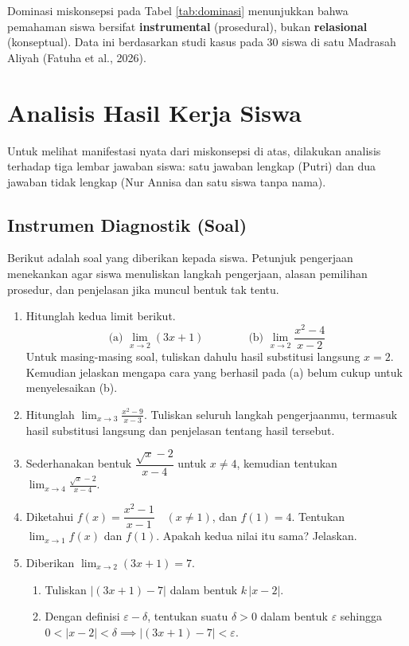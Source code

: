 \documentclass[12pt,a4paper,openany]{book}
\theoremstyle{definition}
\begin{document}
Dominasi miskonsepsi pada Tabel \ref{tab:dominasi} menunjukkan bahwa pemahaman siswa bersifat \textbf{instrumental} (prosedural), bukan \textbf{relasional} (konseptual). Data ini berdasarkan studi kasus pada 30 siswa di satu Madrasah Aliyah (Fatuha et al., 2026).

\chapter{Analisis Hasil Kerja Siswa}

Untuk melihat manifestasi nyata dari miskonsepsi di atas, dilakukan analisis terhadap tiga lembar jawaban siswa: satu jawaban lengkap (Putri) dan dua jawaban tidak lengkap (Nur Annisa dan satu siswa tanpa nama). 

\section{Instrumen Diagnostik (Soal)}
Berikut adalah soal yang diberikan kepada siswa. Petunjuk pengerjaan menekankan agar siswa menuliskan langkah pengerjaan, alasan pemilihan prosedur, dan penjelasan jika muncul bentuk tak tentu.

\begin{enumerate}[label=\textbf{\arabic*.}]
    \item Hitunglah kedua limit berikut.
    \[
    \text{(a) } \lim_{x\to 2}(3x+1)
    \qquad\qquad
    \text{(b) } \lim_{x\to 2}\frac{x^2-4}{x-2}
    \]
    Untuk masing-masing soal, tuliskan dahulu hasil substitusi langsung \(x=2\). Kemudian jelaskan mengapa cara yang berhasil pada (a) belum cukup untuk menyelesaikan (b).

    \item Hitunglah \(\displaystyle \lim_{x\to 3}\frac{x^2-9}{x-3}\). Tuliskan seluruh langkah pengerjaanmu, termasuk hasil substitusi langsung dan penjelasan tentang hasil tersebut.

    \item Sederhanakan bentuk \(\dfrac{\sqrt{x}-2}{x-4}\) untuk \(x\ne 4\), kemudian tentukan \(\displaystyle \lim_{x\to 4}\frac{\sqrt{x}-2}{x-4}\).

    \item Diketahui \(f(x)=\dfrac{x^2-1}{x-1}\quad (x\ne 1)\), dan \(f(1)=4\). Tentukan \(\displaystyle \lim_{x\to 1} f(x)\) dan \(f(1)\). Apakah kedua nilai itu sama? Jelaskan.

    \item Diberikan \(\displaystyle \lim_{x\to 2}(3x+1)=7\).
    \begin{enumerate}[label=(\alph*)]
        \item Tuliskan \(|(3x+1)-7|\) dalam bentuk \(k\,|x-2|\).
        \item Dengan definisi \(\varepsilon-\delta\), tentukan suatu \(\delta>0\) dalam bentuk \(\varepsilon\) sehingga \(0<|x-2|<\delta \implies |(3x+1)-7|<\varepsilon\).
    \end{enumerate}
\end{enumerate}
\end{document}
